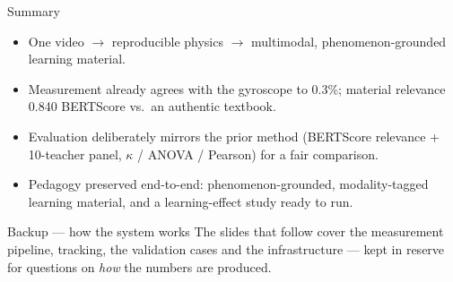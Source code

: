 \documentclass[aspectratio=169,10pt]{beamer}
\begin{document}
{\begin{frame}[plain]{}\end{frame}}
{\begin{frame}[plain]{}\end{frame}}
{\begin{frame}[plain]{}\end{frame}}

\begin{frame}[standout]{Summary}
\begin{itemize}\setlength\itemsep{6pt}
  \item One video $\to$ reproducible physics $\to$ multimodal, phenomenon-grounded learning material.
  \item Measurement already agrees with the gyroscope to \alert{0.3\%}; material relevance \alert{0.840} BERTScore vs.\ an authentic textbook.
  \item Evaluation deliberately mirrors the prior method (BERTScore relevance + \alert{10-teacher} panel, $\kappa$ / ANOVA / Pearson) for a fair comparison.
  \item Pedagogy preserved end-to-end: phenomenon-grounded, modality-tagged learning material, and a learning-effect study ready to run.
\end{itemize}
\end{frame}

\appendix

\begin{frame}[standout]{Backup --- how the system works}
\centering
The slides that follow cover the measurement pipeline, tracking, the validation
cases and the infrastructure --- kept in reserve for questions on \emph{how} the
numbers are produced.
\end{frame}
\end{document}
